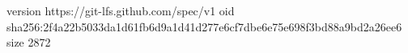 version https://git-lfs.github.com/spec/v1
oid sha256:2f4a22b5033da1d61fb6d9a1d41d277e6cf7dbe6e75e698f3bd88a9bd2a26ee6
size 2872
